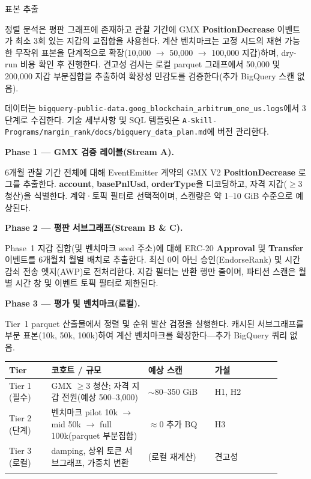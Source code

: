 표본 추출


정렬 분석은 평판 그래프에 존재하고 관찰 기간에 GMX \textbf{PositionDecrease} 이벤트가 최소 3회 있는 지갑의 교집합을 사용한다. 계산 벤치마크는 고정 시드의 재현 가능한 무작위 표본을 단계적으로 확장(10,000 $\to$ 50,000 $\to$ 100,000 지갑)하며, dry-run 비용 확인 후 진행한다. 견고성 검사는 로컬 parquet 그래프에서 50,000 및 200,000 지갑 부분집합을 추출하여 확장성 민감도를 검증한다(추가 BigQuery 스캔 없음).



데이터는 \texttt{bigquery-public-data.goog\_blockchain\_arbitrum\_one\_us.logs}에서 3단계로 수집한다. 기술 세부사항 및 SQL 템플릿은 \texttt{A-Skill-Programs/margin\_rank/docs/bigquery\_data\_plan.md}에 버전 관리한다.


\textbf{Phase 1 --- GMX 검증 레이블(Stream A).}


6개월 관찰 기간 전체에 대해 EventEmitter 계약의 GMX V2 \textbf{PositionDecrease} 로그를 추출한다. \textbf{account}, \textbf{basePnlUsd}, \textbf{orderType}을 디코딩하고, 자격 지갑($\geq 3$ 청산)을 식별한다. 계약·토픽 필터로 선택적이며, 스캔량은 약 1--10 GiB 수준으로 예상된다.


\textbf{Phase 2 --- 평판 서브그래프(Stream B \& C).}


Phase~1 지갑 집합(및 벤치마크 seed 주소)에 대해 ERC-20 \textbf{Approval} 및 \textbf{Transfer} 이벤트를 6개월치 월별 배치로 추출한다. 최신 0이 아닌 승인(EndorseRank) 및 시간 감쇠 전송 엣지(AWP)로 전처리한다. 지갑 필터는 반환 행만 줄이며, 파티션 스캔은 월별 시간 창 및 이벤트 토픽 필터로 제한된다.


\textbf{Phase 3 --- 평가 및 벤치마크(로컬).}


Tier~1 parquet 산출물에서 정렬 및 순위 발산 검정을 실행한다. 캐시된 서브그래프를 부분 표본(10k, 50k, 100k)하여 계산 벤치마크를 확장한다---추가 BigQuery 쿼리 없음.


\begin{longtable}{>{\raggedright\arraybackslash}p{0.14\linewidth}>{\raggedright\arraybackslash}p{0.32\linewidth}>{\raggedright\arraybackslash}p{0.22\linewidth}>{\raggedright\arraybackslash}p{0.22\linewidth}}
\toprule
\textbf{Tier} & \textbf{코호트 / 규모} & \textbf{예상 스캔} & \textbf{가설} \\
\midrule
Tier 1 (필수) & GMX $\geq 3$ 청산; 자격 지갑 전원(예상 500--3,000) & $\sim$80--350 GiB & H1, H2 \\
Tier 2 (단계) & 벤치마크 pilot 10k $\to$ mid 50k $\to$ full 100k(parquet 부분집합) & $\approx 0$ 추가 BQ & H3 \\
Tier 3 (로컬) & damping, 상위 토큰 서브그래프, 가중치 변환 & 0(로컬 재계산) & 견고성 \\
\addlinespace
\bottomrule
\end{longtable}


